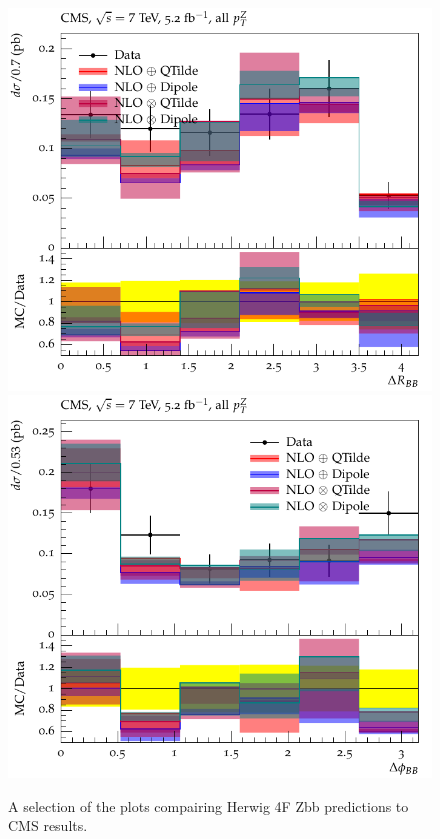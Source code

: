 \documentclass[11pt]{cernrep} \usepackage{graphicx,epsfig} 
\begin{document}
\begin{figure}[htbp]
   \includegraphics[scale=0.65]{figs/zbb/herwigzb/d01-x01-y01.pdf} 
   \includegraphics[scale=0.65]{figs/zbb/herwigzb/d02-x01-y01.pdf} 
\caption{A selection of the plots compairing Herwig 4F Zbb predictions to CMS results.}
\label{zbb-herwigzb-cms}
\end{figure}
\end{document}
